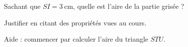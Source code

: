
\begin{exercice}\label{exo2smath-0309}

    \begin{multicols}{2}

    Sachant que $ SI=\SI{3}{\centi\meter}$, quelle est l'aire de la partie grisée ?

Justifier en citant des propriétés vues au cours.

Aide : commencer par calculer l'aire du triangle \( STU\).

\columnbreak

\begin{center}
   
\end{center}
    \end{multicols}

\end{exercice}
